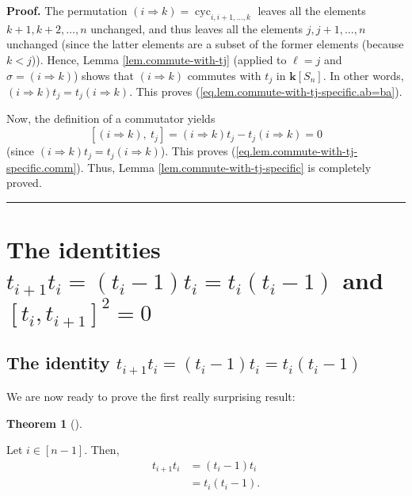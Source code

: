 \documentclass[numbers=enddot,12pt,final,onecolumn,notitlepage]{scrartcl}%
\theoremstyle{definition}
\newtheorem{theo}{Theorem}[section]
\newenvironment{theorem}[1][]
{\begin{theo}[#1]\begin{leftbar}}
{\end{leftbar}\end{theo}}
\newenvironment{proof}[1][Proof]{\noindent\textbf{#1.} }{\ \rule{0.5em}{0.5em}}
\begin{document}
\begin{proof}
The permutation $\left(  i\Longrightarrow k\right)  =\operatorname*{cyc}%
\nolimits_{i,i+1,\ldots,k}$ leaves all the elements $k+1,k+2,\ldots,n$
unchanged, and thus leaves all the elements $j,j+1,\ldots,n$ unchanged (since
the latter elements are a subset of the former elements (because $k<j$)).
Hence, Lemma \ref{lem.commute-with-tj} (applied to $\ell=j$ and $\sigma
=\left(  i\Longrightarrow k\right)  $) shows that $\left(  i\Longrightarrow
k\right)  $ commutes with $t_{j}$ in $\mathbf{k}\left[  S_{n}\right]  $. In
other words, $\left(  i\Longrightarrow k\right)  t_{j}=t_{j}\left(
i\Longrightarrow k\right)  $. This proves
(\ref{eq.lem.commute-with-tj-specific.ab=ba}).

Now, the definition of a commutator yields
\[
\left[  \left(  i\Longrightarrow k\right)  ,\ t_{j}\right]  =\left(
i\Longrightarrow k\right)  t_{j}-t_{j}\left(  i\Longrightarrow k\right)  =0
\]
(since $\left(  i\Longrightarrow k\right)  t_{j}=t_{j}\left(  i\Longrightarrow
k\right)  $). This proves (\ref{eq.lem.commute-with-tj-specific.comm}). Thus,
Lemma \ref{lem.commute-with-tj-specific} is completely proved.
\end{proof}

\section{The identities $t_{i+1}t_{i}=\left(  t_{i}-1\right)  t_{i}%
=t_{i}\left(  t_{i}-1\right)  $ and $\left[  t_{i},t_{i+1}\right]  ^{2}=0$}

\subsection{The identity $t_{i+1}t_{i}=\left(  t_{i}-1\right)  t_{i}%
=t_{i}\left(  t_{i}-1\right)  $}

We are now ready to prove the first really surprising result:

\begin{theorem}
\label{thm.ti+1ti}Let $i\in\left[  n-1\right]  $. Then,%
\begin{align}
t_{i+1}t_{i}  &  =\left(  t_{i}-1\right)  t_{i}\label{eq.thm.ti+1ti.ti-1ti}\\
&  =t_{i}\left(  t_{i}-1\right)  . \label{eq.thm.ti+1ti.titi-1}%
\end{align}

\end{theorem}
\end{document}
